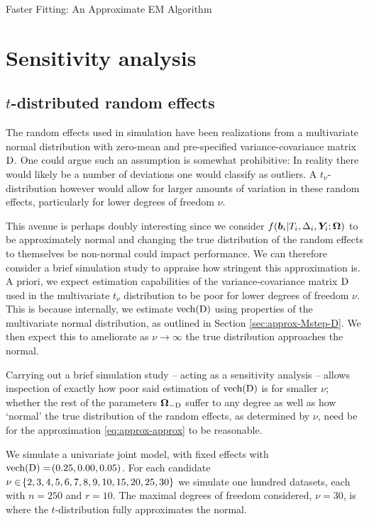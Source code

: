 \begin{chapter}{\label{cha:approx}Faster Fitting: An Approximate EM Algorithm}
  \section{Sensitivity analysis}\label{sec:approx-sens}
  \subsection{\texorpdfstring{$t$-distributed random effects}{REs}}\label{sec:approx-sens-tREs}
  The random effects used in simulation have been realizations from a multivariate normal distribution with zero-mean and pre-specified variance-covariance matrix $\mathrm{D}$. One could argue such an assumption is somewhat prohibitive: In reality there would likely be a number of deviations one would classify as outliers. A $t_\nu$-distribution however would allow for larger amounts of variation in these random effects, particularly for lower degrees of freedom $\nu$.

  This avenue is perhaps doubly interesting since we consider $f\!\left(\bm{b}_i|T_i, \Delta_i, \bm{Y}_i; \bm{\mathrm{\Omega}}\right)$ to be approximately normal and changing the true distribution of the random effects to themselves be non-normal could impact performance. We can therefore consider a brief simulation study to appraise how stringent this approximation is. A priori, we expect estimation capabilities of the variance-covariance matrix $\mathrm{D}$ used in the multivariate $t_\nu$ distribution to be poor for lower degrees of freedom $\nu$. This is because internally, we estimate $\text{vech}\!\left(\mathrm{D}\right)$ using properties of the multivariate normal distribution, as outlined in Section \ref{sec:approx-Mstep-D}. We then expect this to ameliorate as $\nu\rightarrow\infty$ \ie the true distribution approaches the normal.
  
  Carrying out a brief simulation study -- acting as a sensitivity analysis -- allows inspection of exactly how poor said estimation of $\text{vech}\!\left(\mathrm{D}\right)$ is for smaller $\nu$; whether the rest of the parameters $\bm{\mathrm{\Omega}}_{-\mathrm{D}}$ suffer to any degree as well as how `normal' the true distribution of the random effects, as determined by $\nu$, need be for the approximation \eqref{eq:approx-approx} to be reasonable.
  
  We simulate a univariate joint model, with fixed effects with $\text{vech}\!\left(\mathrm{D}\right)=\!\left(0.25,0.00,0.05\right)$. For each candidate $\nu\in\!\left\{2, 3, 4, 5, 6, 7, 8, 9, 10,15, 20, 25, 30\right\}$ we simulate one hundred datasets, each with $n=250$ and $r=10$. The maximal degrees of freedom considered, $\nu=30$, is where the $t$-distribution fully approximates the normal.


\end{chapter}
